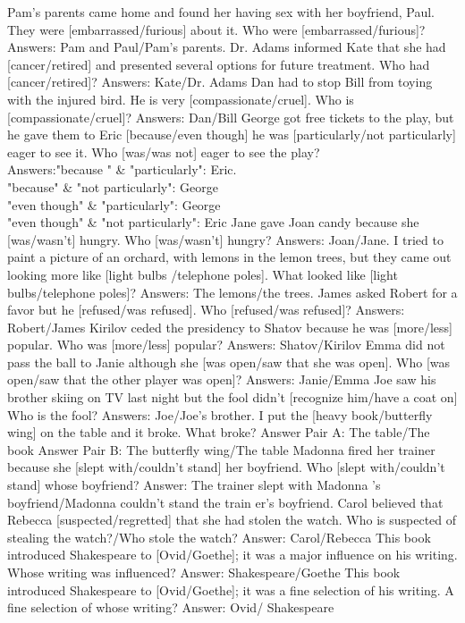 \begin{foo}
Pam's parents came home and found her having sex with her boyfriend, Paul. They were [embarrassed/furious] about it. Who were [embarrassed/furious]? Answers: Pam and Paul/Pam's parents.
Dr. Adams informed Kate that she had [cancer/retired] and presented several options for future treatment. Who had [cancer/retired]? Answers: Kate/Dr. Adams
Dan had to stop Bill from toying with the injured bird. He is very [compassionate/cruel]. Who is [compassionate/cruel]? Answers: Dan/Bill
George got free tickets to the play, but he gave them to Eric [because/even though] he was [particularly/not particularly] eager to see it. Who [was/was not] eager to see the play? \\Answers:"because " \& "particularly": Eric.\\ "because" \&  "not particularly": George\\"even though"  \& "particularly":  George\\"even though" \&  "not particularly": Eric
Jane gave Joan candy because she [was/wasn't] hungry. Who [was/wasn't] hungry? Answers: Joan/Jane.
I tried to paint a picture of an orchard, with lemons in the lemon trees, but they came out looking more like [light bulbs /telephone poles]. What looked like [light bulbs/telephone poles]? Answers: The lemons/the trees.
James asked Robert for a favor but he [refused/was refused]. Who [refused/was refused]? Answers: Robert/James
Kirilov ceded the presidency to Shatov because he was [more/less] popular. Who was [more/less] popular? Answers: Shatov/Kirilov
Emma did not pass the ball to Janie although she [was open/saw that she was open]. Who [was open/saw that the other player was open]? Answers: Janie/Emma
Joe saw his brother skiing on TV last night but the fool didn't [recognize him/have a coat on] Who is the fool? Answers: Joe/Joe's brother.
I put the [heavy book/butterfly wing] on the table and it broke. What broke? Answer Pair A: The table/The book Answer Pair B: The butterfly wing/The table
Madonna fired her trainer because she [slept with/couldn't stand] her boyfriend. Who [slept with/couldn't stand] whose boyfriend? Answer: The trainer slept with Madonna 's boyfriend/Madonna couldn't stand the  train er's boyfriend.
Carol believed that Rebecca [suspected/regretted] that she had stolen the watch. Who is suspected of stealing the watch?/Who stole the watch? Answer: Carol/Rebecca
This book introduced Shakespeare to [Ovid/Goethe]; it was a major influence on his writing. Whose writing was influenced? Answer: Shakespeare/Goethe
This book introduced Shakespeare to [Ovid/Goethe]; it was a fine selection of his writing. A fine selection of whose writing? Answer: Ovid/ Shakespeare

\end{foo}
